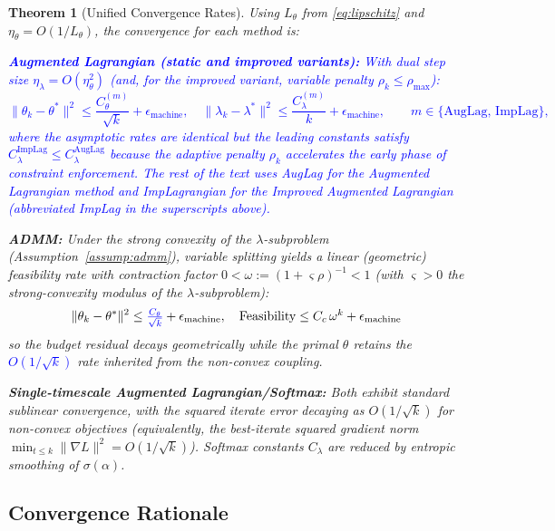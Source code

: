 \documentclass[preprint,12pt,authoryear]{elsarticle}
\newtheorem{theorem}{Theorem}
\begin{document}
\begin{theorem}[Unified Convergence Rates]\label{thm:unified_convergence}
Using $L_\theta$ from \eqref{eq:lipschitz} and $\eta_\theta = O(1/L_\theta)$, the convergence for each method is:

\textcolor{blue}{\textbf{Augmented Lagrangian (static and improved variants):}
With dual step size $\eta_\lambda = O(\eta_\theta^2)$ (and, for the improved variant,
variable penalty $\rho_k \leq \rho_{\max}$):
\begin{equation}
    \|\theta_k - \theta^*\|^2 \leq \frac{C_\theta^{(m)}}{\sqrt{k}} + \epsilon_{\text{machine}},
    \quad
    \|\lambda_k - \lambda^*\|^2 \leq \frac{C_\lambda^{(m)}}{k} + \epsilon_{\text{machine}},
    \qquad m \in \{\mathrm{AugLag},\, \mathrm{ImpLag}\},
\end{equation}
where the asymptotic rates are identical but the leading constants satisfy
$C_\lambda^{\mathrm{ImpLag}} \le C_\lambda^{\mathrm{AugLag}}$ because the adaptive
penalty $\rho_k$ accelerates the early phase of constraint enforcement. The rest of the text uses AugLag for the Augmented Lagrangian method and ImpLagrangian for the Improved Augmented Lagrangian (abbreviated ImpLag in the superscripts above).
}


\textbf{ADMM:} Under the strong convexity of the $\lambda$-subproblem
(Assumption~\ref{assump:admm}), variable splitting yields a linear
(geometric) feasibility rate with contraction factor
$0 < \omega := (1+\varsigma\rho)^{-1} < 1$ (with $\varsigma>0$ the strong-convexity modulus of the $\lambda$-subproblem):
\begin{equation}
    \|\theta_k - \theta^*\|^2 \leq \textstyle \textcolor{blue}{\frac{C_\theta}{\sqrt{k}}} + \epsilon_{\text{machine}}, \quad \text{Feasibility} \leq C_c\,\omega^{k} + \epsilon_{\text{machine}}
\end{equation}
so the budget residual decays geometrically while the primal $\theta$ retains the \textcolor{blue}{$O(1/\sqrt{k})$} rate inherited from the non-convex coupling.

\textbf{Single-timescale Augmented Lagrangian/Softmax:} Both exhibit standard sublinear convergence, with the squared iterate error decaying as $O(1/\sqrt{k})$ for non-convex objectives (equivalently, the best-iterate squared gradient norm $\min_{t\le k}\|\nabla L\|^2 = O(1/\sqrt{k})$). Softmax constants $C_\lambda$ are reduced by entropic smoothing of $\sigma(\alpha)$.
\end{theorem}


\subsection{Convergence Rationale}
\end{document}
